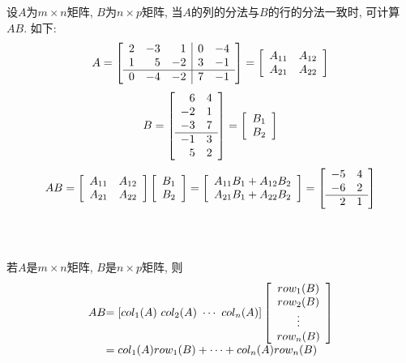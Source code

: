 设$A$为$m\times n$矩阵, $B$为$n\times p$矩阵, 当$A$的列的分法与$B$的行的分法一致时, 可计算$AB$. 如下:
\[A=\left[\begin{array}{r r r|r r}
2 & -3 & 1 & 0 & -4\\
1 & 5 & -2 & 3 & -1\\\hline
0 & -4 & -2 & 7 & -1
\end{array}\right]=
\left[\begin{array}{l l}
A_{11} & A_{12}\\
A_{21} & A_{22}
\end{array}\right]\]
\[B=\left[\begin{array}{r r}
6 & 4\\
-2 & 1\\
-3 & 7\\\hline
-1 & 3\\
5 & 2
\end{array}\right]=
\left[\begin{array}{l}
B_1\\
B_2
\end{array}\right]\]
\[AB=\left[
\begin{array}{l l}
A_{11} & A_{12}\\
A_{21} & A_{22}
\end{array}
\right]\left[
\begin{array}{l}
B_1\\
B_2
\end{array}
\right]=\left[
\begin{array}{l}
A_{11}B_1+A_{12}B_2\\
A_{21}B_1+A_{22}B_2
\end{array}
\right]=\left[
\begin{array}{r r}
-5 & 4\\
-6 & 2\\\hline
2 & 1
\end{array}
\right]\]\\[2ex]

\begin{theorem}[$AB$的列行展开]\ \\
若$A$是$m\times n$矩阵, $B$是$n\times p$矩阵, 则
\[\begin{array}{l@{}l}
AB & =[col_1(A)\ col_2(A)\ \cdots\ col_n(A)]\left[
\begin{array}{c}
row_1(B)\\
row_2(B)\\
\vdots\\
row_n(B)
\end{array}
\right]\\
& =col_1(A)row_1(B)+\cdots+col_n(A)row_n(B)
\end{array}\]
\end{theorem}\vspace{8ex}

